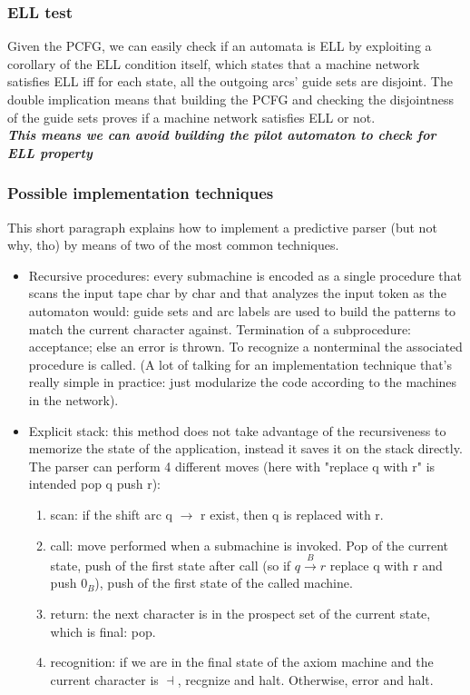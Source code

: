 			\subsubsection{ELL test}
				Given the PCFG, we can easily check if an automata is ELL by exploiting a corollary of the ELL condition itself, which states that a machine network satisfies ELL iff for each state, all the outgoing arcs' guide sets are disjoint. The double implication means that building the PCFG and checking the disjointness of the guide sets proves if a machine network satisfies ELL or not.\\
				\emph{\textbf{This means we can avoid building the pilot automaton to check for ELL property}}
				
			\subsubsection{Possible implementation techniques}
				This short paragraph explains how to implement a predictive parser (but not why, tho) by means of two of the most common techniques.
				\begin{itemize}
					\item Recursive procedures: every submachine is encoded as a single procedure that scans the input tape char by char and that analyzes the input token as the automaton would: guide sets and arc labels are used to build the patterns to match the current character against. Termination of a subprocedure: acceptance; else an error is thrown. To recognize a nonterminal the associated procedure is called. (A lot of talking for an implementation technique that's really simple in practice: just modularize the code according to the machines in the network).
					\item Explicit stack: this method does not take advantage of the recursiveness to memorize the state of the application, instead it saves it on the stack directly. The parser can perform 4 different moves (here with "replace q with r" is intended pop q push r):
						\begin{enumerate}
							\item scan: if the shift arc q $\rightarrow$ r exist, then q is replaced with r.
							\item call: move performed when a submachine is invoked. Pop of the current state, push of the first state after call (so if $q \xrightarrow{B} r$ replace q with r and push $0_B$), push of the first state of the called machine.
							\item return: the next character is in the prospect set of the current state, which is final: pop.
							\item recognition: if we are in the final state of the axiom machine and the current character is $\dashv$, recgnize and halt. Otherwise, error and halt.
						\end{enumerate}
				\end{itemize}
				
